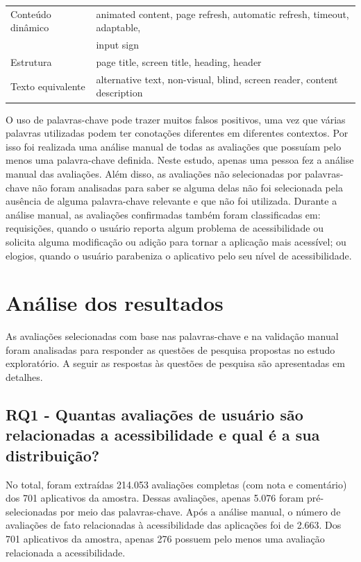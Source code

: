 \begin{table}[!htb]
\begin{tabular}{|l|l|}
\hline
Conteúdo dinâmico & animated content, page refresh, automatic  
refresh, timeout,  adaptable, \\&input sign                                                               \\

\hline
Estrutura                   & page title, screen title, heading, header                                                                                                         \\
\hline
Texto equivalente             & alternative text, non-visual, blind, screen reader, content description  \\
\hline
\end{tabular}
\end{table}

O uso de palavras-chave pode trazer muitos falsos positivos, uma vez que várias palavras utilizadas podem ter conotações diferentes em diferentes contextos. Por isso foi realizada uma análise manual de todas as avaliações que possuíam pelo menos uma palavra-chave definida. Neste estudo, apenas uma pessoa fez a análise manual das avaliações. Além disso, as avaliações não selecionadas por palavras-chave não foram analisadas para saber se alguma delas não foi selecionada pela ausência de alguma palavra-chave relevante e que não foi utilizada. Durante a análise manual, as avaliações confirmadas também foram classificadas em: 
requisições, quando o usuário reporta algum problema de acessibilidade ou solicita alguma modificação ou adição para tornar a aplicação mais acessível;
ou elogios, quando o usuário parabeniza o aplicativo pelo seu nível de acessibilidade.


\section{Análise dos resultados}

As avaliações selecionadas com base nas palavras-chave e na validação manual foram analisadas para responder as questões de pesquisa propostas no estudo exploratório. A seguir as respostas às questões de pesquisa são apresentadas em detalhes. 

 
\subsection{RQ1 - Quantas avaliações de usuário são relacionadas a acessibilidade e qual é a sua distribuição? }

No total, foram extraídas 214.053 avaliações completas (com nota e comentário) dos 701 aplicativos da amostra. 
Dessas avaliações, apenas 5.076 foram pré-selecionadas por meio das palavras-chave. 
Após a análise manual, o número de avaliações de fato relacionadas à acessibilidade das aplicações foi de 2.663. Dos 701 aplicativos da amostra, apenas 276 possuem pelo menos uma avaliação relacionada a acessibilidade.

